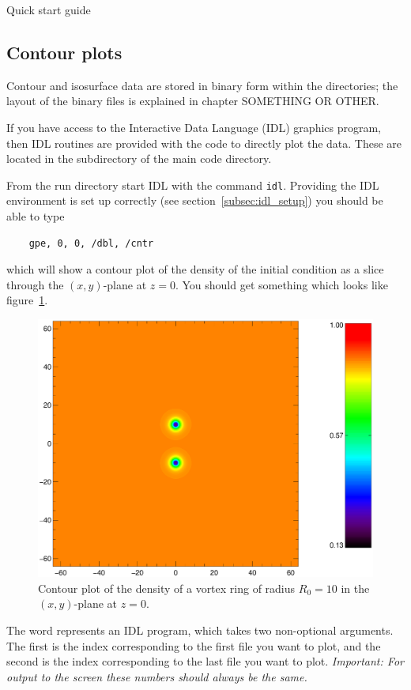 \begin{chapter}{\label{cha:quickstart} Quick start guide}
  \subsection{\label{subsec:contour_plots}Contour plots}
  Contour and isosurface data are stored in binary form within the
   directories; the layout of the binary files is explained in
  chapter SOMETHING OR OTHER.

  If you have access to the Interactive Data Language (IDL) graphics program,
  then IDL routines are provided with the code to directly plot the data.
  These are located in the  subdirectory of the main code
  directory.

  From the run directory start IDL with the command \verb"idl".  Providing the
  IDL environment is set up correctly (see section~\ref{subsec:idl_setup}) you
  should be able to type
  \begin{Verbatim}
    gpe, 0, 0, /dbl, /cntr
  \end{Verbatim}
  which will show a contour plot of the density of the initial condition as a
  slice through the $(x,y)$-plane at $z=0$.  You should get something which
  looks like figure~\ref{fig:ring_ic_con}.
  \begin{figure}
    \centering
    \includegraphics[scale=0.5]{fig/ring_ic_con}
    \caption{\label{fig:ring_ic_con}Contour plot of the density of a vortex
      ring of radius $R_{0}=10$ in the $(x,y)$-plane at $z=0$.}
  \end{figure}
  The word  represents an IDL program, which takes two non-optional
  arguments.  The first is the index corresponding to the first file you want
  to plot, and the second is the index corresponding to the last file you want
  to plot.  \emph{Important: For output to the screen these numbers should
  always be the same.}


\end{chapter}

